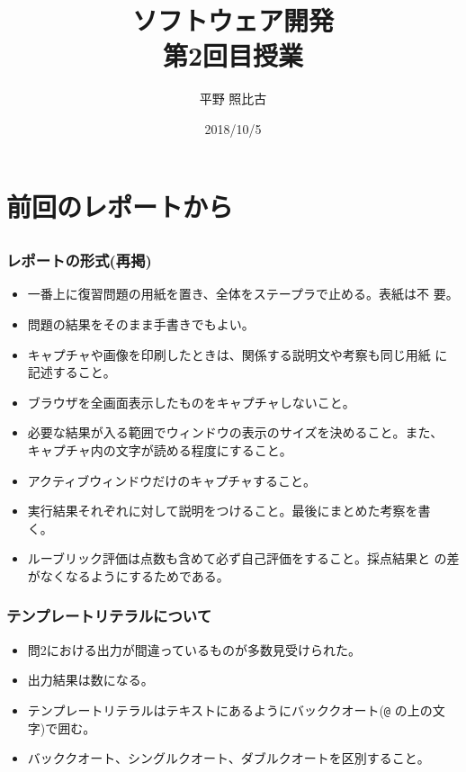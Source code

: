 
\title{ソフトウェア開発\\第2回目授業}
\author{平野 照比古}
\institute{}
\date{2018/10/5}

\frame{\maketitle}
\section{前回のレポートから}\subsection{}
\begin{frame}[containsverbatim]
 \frametitle{レポートの形式(再掲)}
 \begin{itemize}
  \item 一番上に復習問題の用紙を置き、全体をステープラで止める。表紙は不
        要。
  \item 問題の結果をそのまま手書きでもよい。
  \item キャプチャや画像を印刷したときは、関係する説明文や考察も同じ用紙
        に記述すること。
  \item ブラウザを全画面表示したものをキャプチャしないこと。
  \item 必要な結果が入る範囲でウィンドウの表示のサイズを決めること。また、
        キャプチャ内の文字が読める程度にすること。
	\item アクティブウィンドウだけのキャプチャすること。
	\item 実行結果それぞれに対して説明をつけること。最後にまとめた考察を書
				く。
  \item ルーブリック評価は点数も含めて必ず自己評価をすること。採点結果と
        の差がなくなるようにするためである。
 \end{itemize}
\end{frame}
\begin{frame}[containsverbatim]
 \frametitle{テンプレートリテラルについて}
\begin{itemize}
 \item 問2における出力が間違っているものが多数見受けられた。
 \item 出力結果は数になる。
 \item テンプレートリテラルはテキストにあるようにバッククオート(\Verb+@+
       の上の文字)で囲む。
 \item バッククオート、シングルクオート、ダブルクオートを区別すること。
\end{itemize} 
\end{frame}
